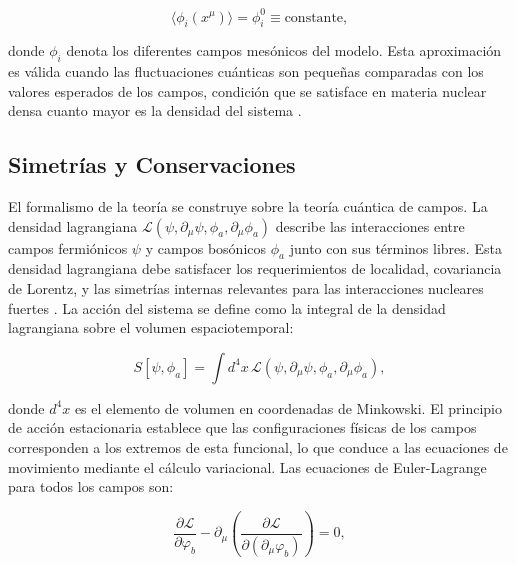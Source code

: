 \begin{equation}
	\langle \phi_i(x^\mu) \rangle = \phi_i^0 \equiv \text{constante},
	\label{eq:campo_medio}
\end{equation}

donde $\phi_i$ denota los diferentes campos mesónicos del modelo. Esta aproximación es válida cuando las fluctuaciones cuánticas son pequeñas comparadas con los valores esperados de los campos, condición que se satisface en materia nuclear densa cuanto mayor es la densidad del sistema \cite{waleckaRelativisticNuclearManyBody1986}.

\subsection{Simetrías y Conservaciones}

El formalismo de la teoría se construye sobre la teoría cuántica de campos. La densidad lagrangiana $\mathcal{L}(\psi, \partial_\mu \psi, \phi_a, \partial_\mu \phi_a)$ describe las interacciones entre campos fermiónicos $\psi$ y campos bosónicos $\phi_a$ junto con sus términos libres. Esta densidad lagrangiana debe satisfacer los requerimientos de localidad, covariancia de Lorentz, y las simetrías internas relevantes para las interacciones nucleares fuertes \cite{glendenningCompactStarsNuclear2000}. La acción del sistema se define como la integral de la densidad lagrangiana sobre el volumen espaciotemporal:

\begin{equation}
	S[\psi, \phi_a] = \int d^4x \, \mathcal{L}(\psi, \partial_\mu \psi, \phi_a, \partial_\mu \phi_a),
	\label{eq:accion}
\end{equation}

donde $d^4x$ es el elemento de volumen en coordenadas de Minkowski. El principio de acción estacionaria establece que las configuraciones físicas de los campos corresponden a los extremos de esta funcional, lo que conduce a las ecuaciones de movimiento mediante el cálculo variacional. Las ecuaciones de Euler-Lagrange para todos los campos son:

\begin{equation}
	\frac{\partial \mathcal{L}}{\partial \varphi_b} - \partial_\mu \left( \frac{\partial \mathcal{L}}{\partial (\partial_\mu \varphi_b)} \right) = 0,
	\label{eq:euler_lagrange}
\end{equation}


